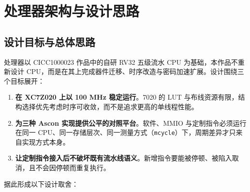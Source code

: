 \section{处理器架构与设计思路}

\Needspace{85pt}

\subsection{设计目标与总体思路}

处理器以 CICC1000023 作品中的自研 RV32 五级流水 CPU 为基础，本作品不重新设计 CPU，而是在其上完成器件迁移、时序改造与密码加速扩展。设计围绕三个目标展开：

\begin{enumerate}
\def\labelenumi{\arabic{enumi}.}
\tightlist
\item
  \textbf{在 XC7Z020 上以 100 MHz 稳定运行}。7020 的 LUT 与布线资源有限，结构选择优先考虑时序可收敛，而不是追求更高的单线程性能。
\item
  \textbf{为三种 Ascon 实现提供公平的对照平台}。软件、MMIO 与定制指令必须运行在同一 CPU、同一存储层次、同一测量方式（\texttt{mcycle}）下，周期差异才只来自实现方式本身。
\item
  \textbf{让定制指令接入后不破坏既有流水线语义}。新增指令要能被停顿、被陷入取消，且不会因停顿而重复执行。
\end{enumerate}

据此形成以下设计取舍：

